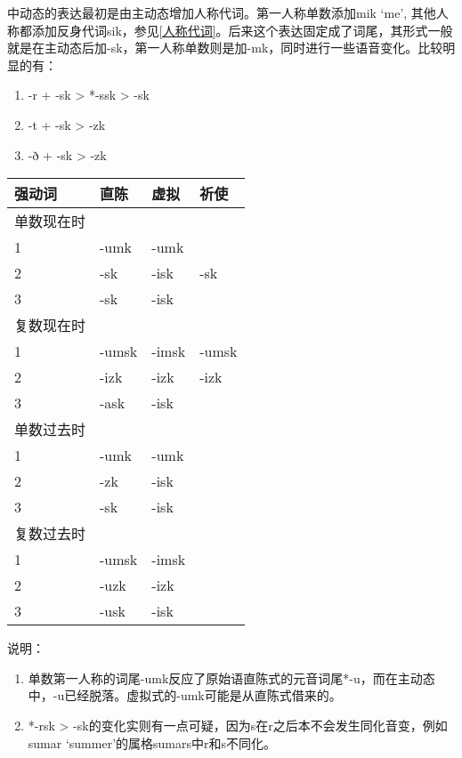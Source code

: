中动态的表达最初是由主动态增加人称代词。第一人称单数添加mik `me',
其他人称都添加反身代词sik，参见\ref{人称代词}。后来这个表达固定成了词尾，其形式一般就是在主动态后加-sk，第一人称单数则是加-mk，同时进行一些语音变化。比较明显的有：

\begin{enumerate}
    \item
          -r + -sk > *-ssk > -sk
    \item
          -t + -sk > -zk
    \item
          -ð + -sk > -zk
\end{enumerate}

\begin{longtable}{llll}
    \toprule
    强动词     & 直陈  & 虚拟  & 祈使  \\
    \midrule
    \endhead
    \bottomrule
    \endfoot
    单数现在时 &       &       &       \\
    1          & -umk  & -umk  &       \\
    2          & -sk   & -isk  & -sk   \\
    3          & -sk   & -isk  &       \\
    复数现在时 &       &       &       \\
    1          & -umsk & -imsk & -umsk \\
    2          & -izk  & -izk  & -izk  \\
    3          & -ask  & -isk  &       \\
    单数过去时 &       &       &       \\
    1          & -umk  & -umk  &       \\
    2          & -zk   & -isk  &       \\
    3          & -sk   & -isk  &       \\
    复数过去时 &       &       &       \\
    1          & -umsk & -imsk &       \\
    2          & -uzk  & -izk  &       \\
    3          & -usk  & -isk  &       \\
\end{longtable}

说明：

\begin{enumerate}
    \item
          单数第一人称的词尾-umk反应了原始语直陈式的元音词尾*-u，而在主动态中，-u已经脱落。虚拟式的-umk可能是从直陈式借来的。
    \item
          *-rsk > -sk的变化实则有一点可疑，因为s在r之后本不会发生同化音变，例如sumar `summer'的属格sumars中r和s不同化。
\end{enumerate}


